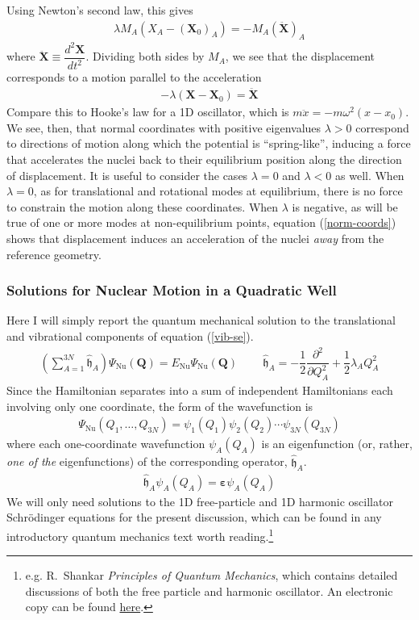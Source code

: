 \documentclass[11pt]{article}
\newcommand{\bo}[1]{\ensuremath{\mathbf{#1}}}
\renewcommand{\sp}{\ \ \ \ \ \ \ \ \ \ }
\newcommand{\fr}[2]{\dfrac{#1}{#2}}
\newcommand{\pr}[1]{\left(#1\right)}
\newcommand{\pd}[3]{\ensuremath{ \dfrac{ \partial^{#1} #2 }{\partial #3 ^{#1}}}}
\newcommand{\ld}{\ensuremath{\ldots}}
\newcommand{\Nu}{\ensuremath{\mathrm{Nu}}}
\newcommand{\op}[1]{\ensuremath{\hat{#1}}}
\newcommand{\Y}{\ensuremath{\Psi}}
\newcommand{\y}{\ensuremath{\psi}}
\newcommand{\w}{\ensuremath{\omega}}
\newcommand{\la}{\ensuremath{\lambda}}
\newcommand{\mf}[1]{\ensuremath{\mathfrak{#1}}}
\newcommand{\e}{\ensuremath{\bm\varepsilon}}
\begin{document}
Using Newton's second law, this gives
\begin{align*}
%
	\la
	M_A
	(X_A-(\bo{X}_0)_A)
=
-
	M_A
	(\bo{\ddot{X}})_A
\end{align*}
where $\bo{\ddot{X}}\equiv \fr{d^2\bo{X}}{dt^2}$.
Dividing both sides by $M_A$, we see that the displacement corresponds to a motion parallel to the acceleration
\begin{align}
\label{norm-coords}
-
	\la
	(\bo{X}-\bo{X}_0)
=
%
	\bo{\ddot{X}}
\end{align}
Compare this to Hooke's law for a 1D oscillator, which is $m\ddot{x}=-m\w^2(x-x_0)$.
We see, then, that normal coordinates with positive eigenvalues $\la>0$ correspond to directions of motion along which the potential is ``spring-like'', inducing a force that accelerates the nuclei back to their equilibrium position along the direction of displacement.
It is useful to consider the cases $\la=0$ and $\la<0$ as well.
When $\la=0$, as for translational and rotational modes at equilibrium, there is no force to constrain the motion along these coordinates.
When $\la$ is negative, as will be true of one or more modes at non-equilibrium points, equation (\ref{norm-coords}) shows that displacement induces an acceleration of the nuclei {\it away} from the reference geometry.


\subsubsection{Solutions for Nuclear Motion in a Quadratic Well}
Here I will simply report the quantum mechanical solution to the translational and vibrational components of equation (\ref{vib-se}).
\begin{align*}
\pr{\sum_{A=1}^{3N}
	\op{\mf{h}}_A }
	\Y_\Nu(\bo{Q})
=
	E_\Nu
	\Y_\Nu(\bo{Q})
\sp
	\op{\mf{h}}_A
=
-\fr{1}{2}
	\pd{2}{}{Q_A}
+\fr{1}{2}
	\la_A Q_A^2
\end{align*}
Since the Hamiltonian separates into a sum of independent Hamiltonians each involving only one coordinate, the form of the wavefunction is
\begin{align}
	\Y_\Nu(Q_1,\ld,Q_{3N})
=
	\y_1(Q_1)
	\y_2(Q_2)
	\cdots
	\y_{3N}(Q_{3N})
\end{align}
where each one-coordinate wavefunction $\y_A(Q_A)$ is an eigenfunction (or, rather, {\it one of the} eigenfunctions) of the corresponding operator, $\op{\mf{h}}_A$.
\begin{align}
	\op{\mf{h}}_A
	\y_A(Q_A)
=
	\e
	\y_A(Q_A)
\end{align}
We will only need solutions to the 1D free-particle and 1D harmonic oscillator Schr\"odinger equations for the present discussion, which can be found in any introductory quantum mechanics text worth reading.\footnote{e.g. R.\ Shankar {\it Principles of Quantum Mechanics}, which contains detailed discussions of both the free particle and harmonic oscillator. An electronic copy can be found \href{http://home.basu.ac.ir/\~psu/Books/\%5BRamamurti_Shankar\%5D_Principles_of_Quantum_Mechanic\%28BookFi.org\%29.pdf}{here}.}
\end{document}
